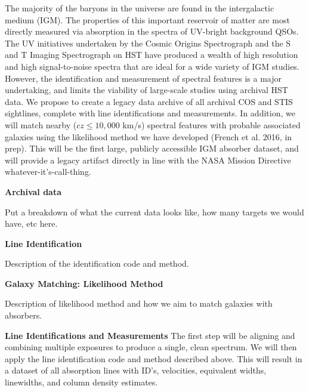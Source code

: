 \documentclass[12pt]{article}
\begin{document}
%
%
\justification          %

The majority of the baryons in the universe are found in the intergalactic medium (IGM). The properties of this important reservoir of matter are most directly measured via absorption in the spectra of UV-bright background QSOs. The UV initiatives undertaken by the Cosmic Origins Spectrograph and the S and T Imaging Spectrograph on HST have produced a wealth of high resolution and high signal-to-noise spectra that are ideal for a wide variety of IGM studies. However, the identification and measurement of spectral features is a major undertaking, and limits the viability of large-scale studies using archival HST data. We propose to create a legacy data archive of all archival COS and STIS sightlines, complete with line identifications and measurements. In addition, we will match nearby ($cz \leq 10,000$ km/s) spectral features with probable associated galaxies using the likelihood method we have developed (French et al. 2016, in prep). This will be the first large, publicly accessible IGM absorber dataset, and will provide a legacy artifact directly in line with the NASA Mission Directive whatever-it's-call-thing.

\textbf{Archival data}

Put a breakdown of what the current data looks like, how many targets we would have, etc here.

\textbf{Line Identification}

Description of the identification code and method.

\textbf{Galaxy Matching: Likelihood Method}

Description of likelihood method and how we aim to match galaxies with absorbers.





%
%
\describearchival       %

\textbf{Line Identifications and Measurements}
\indent The first step will be aligning and combining multiple exposures to produce a single, clean spectrum. We will then apply the line identification code and method described above. This will result in a dataset of all absorption lines with ID's, velocities, equivalent widths, linewidths, and column density estimates. 
\end{document}
